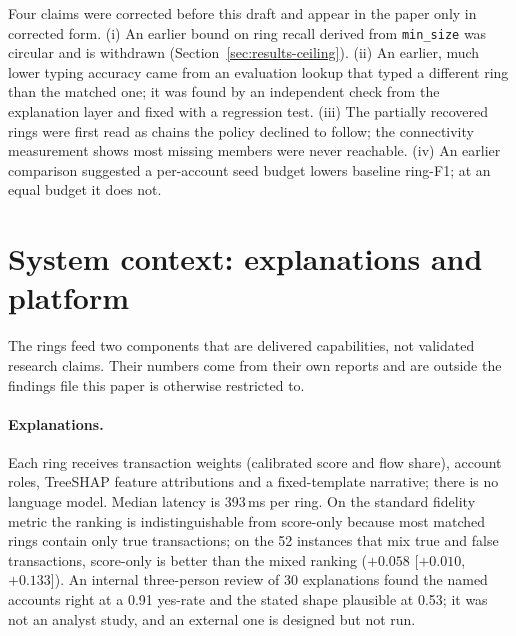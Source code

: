 Four claims were corrected before this draft and appear in the paper only in corrected form.
(i) An earlier bound on ring recall derived from \texttt{min\_size} was circular and is
withdrawn (Section~\ref{sec:results-ceiling}). (ii) An earlier, much lower typing accuracy
came from an evaluation lookup that typed a different ring than the matched one; it was found
by an independent check from the explanation layer and fixed with a regression test. (iii) The
partially recovered rings were first read as chains the policy declined to follow; the
connectivity measurement shows most missing members were never reachable. (iv) An earlier
comparison suggested a per-account seed budget lowers baseline ring-F1; at an equal budget it
does not.

\section{System context: explanations and platform}
\label{app:platform}

The rings feed two components that are delivered capabilities, not validated research claims.
Their numbers come from their own reports and are outside the findings file this paper is
otherwise restricted to.

\paragraph{Explanations.}
Each ring receives transaction weights (calibrated score and flow share), account roles,
TreeSHAP feature attributions and a fixed-template narrative; there is no language model.
Median latency is 393\,ms per ring. On the standard fidelity metric the ranking is
indistinguishable from score-only because most matched rings contain only true transactions;
on the 52 instances that mix true and false transactions, score-only is better than the mixed
ranking ($+0.058$ [$+0.010$, $+0.133$]). An internal three-person review of 30 explanations
found the named accounts right at a 0.91 yes-rate and the stated shape plausible at 0.53; it
was not an analyst study, and an external one is designed but not run.

